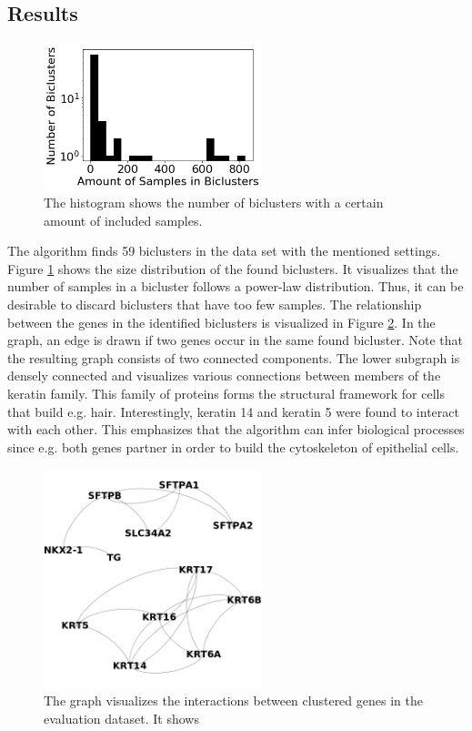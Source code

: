 \documentclass[10pt, conference, compsocconf]{IEEEtran}
\begin{document}
\subsection{Results}
\begin{figure}[h]
\centering
\includegraphics[width=2.5in]{figures/histogram.png}
\caption{The histogram shows the number of biclusters with a certain amount of included samples.}
\label{fig:histogram}
\end{figure}
The algorithm finds 59 biclusters in the data set with the mentioned settings.
Figure \ref{fig:histogram} shows the size distribution of the found biclusters.
It visualizes that the number of samples in a bicluster follows a power-law distribution.
Thus, it can be desirable to discard biclusters that have too few samples.
The relationship between the genes in the identified biclusters is visualized in Figure \ref{fig:cluster_gene_graph}.
In the graph, an edge is drawn if two genes occur in the same found bicluster.
Note that the resulting graph consists of two connected components.
The lower subgraph is densely connected and visualizes various connections between members of the keratin family.
This family of proteins forms the structural framework for cells that build e.g. hair.
Interestingly, keratin 14 and keratin 5 were found to interact with each other.
This emphasizes that the algorithm can infer biological processes since e.g. both genes partner in order to build the cytoskeleton of epithelial cells.
\begin{figure}[h]
\centering
\includegraphics[width=2.5in]{figures/cluster_gene_graph.png}
\caption{The graph visualizes the interactions between clustered genes in the evaluation dataset. It shows}
\label{fig:cluster_gene_graph}
\end{figure}
\end{document}
